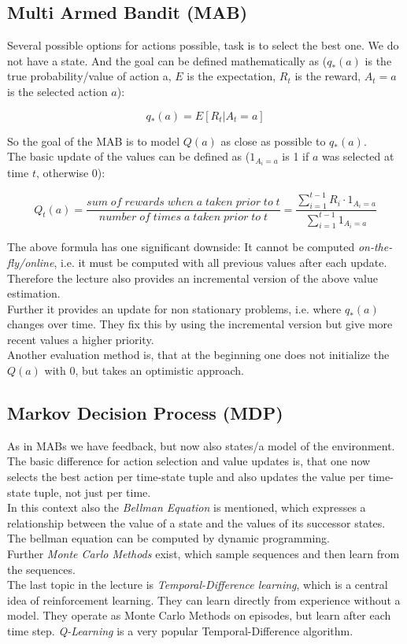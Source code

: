 \documentclass[12pt,a4paper]{article}
\begin{document}
\subsection{Multi Armed Bandit (MAB)}

\noindent Several possible options for actions possible, task is to select the best one. We do not have a state. And the goal can be defined mathematically as (\(q_*(a)\) is the true probability/value of action a, \(E\) is the expectation, \(R_t\) is the reward, \(A_t = a\) is the selected action \(a\)):

\[q_*(a) = E[R_t | A_t = a]\]

\noindent So the goal of the MAB is to model \(Q(a)\) as close as possible to \(q_*(a)\).\\
The basic update of the values can be defined as (\(1_{A_i = a}\) is 1 if \(a\) was selected at time \(t\), otherwise 0):

\[Q_t(a) = \frac{sum \; of \; rewards \; when \; a \; taken \; prior \; to \; t}{number \; of \; times \; a \; taken \; prior \; to \; t} = \frac{\sum_{i = 1}^{t-1} R_i \cdot 1_{A_i = a}}{\sum_{i = 1}^{t-1} 1_{A_i = a}}\]

\noindent The above formula has one significant downside: It cannot be computed \textit{on-the-fly/online}, i.e. it must be computed with all previous values after each update. Therefore the lecture also provides an incremental version of the above value estimation.\\
Further it provides an update for non stationary problems, i.e. where \(q_*(a)\) changes over time. They fix this by using the incremental version but give more recent values a higher priority.\\
Another evaluation method is, that at the beginning one does not initialize the \(Q(a)\) with 0, but takes an optimistic approach.\\

\subsection{Markov Decision Process (MDP)}

\noindent As in MABs we have feedback, but now also states/a model of the environment. The basic difference for action selection and value updates is, that one now selects the best action per time-state tuple and also updates the value per time-state tuple, not just per time.\\[1em]
In this context also the \textit{Bellman Equation} is mentioned, which expresses a relationship between the value of a state and the values of its successor states. The bellman equation can be computed by dynamic programming.\\[1em]
Further \textit{Monte Carlo Methods} exist, which sample sequences and then learn from the sequences.\\[1em]
The last topic in the lecture is \textit{Temporal-Difference learning}, which is a central idea of reinforcement learning. They can learn directly from experience without a model. They operate as Monte Carlo Methods on episodes, but learn after each time step. \textit{Q-Learning} is a very popular Temporal-Difference algorithm.
\end{document}
